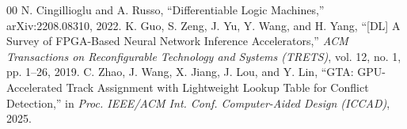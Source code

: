 \documentclass[conference]{IEEEtran}
\begin{document}
\begin{thebibliography}{00}
    N. Cingillioglu and A. Russo, ``Differentiable Logic Machines,'' arXiv:2208.08310, 2022.
    K. Guo, S. Zeng, J. Yu, Y. Wang, and H. Yang, ``[DL] A Survey of FPGA-Based Neural Network Inference Accelerators,'' \emph{ACM Transactions on Reconfigurable Technology and Systems (TRETS)}, vol. 12, no. 1, pp. 1--26, 2019.
    C. Zhao, J. Wang, X. Jiang, J. Lou, and Y. Lin, ``GTA: GPU-Accelerated Track Assignment with Lightweight Lookup Table for Conflict Detection,'' in \emph{Proc. IEEE/ACM Int. Conf. Computer-Aided Design (ICCAD)}, 2025.
\end{thebibliography}
\end{document}
